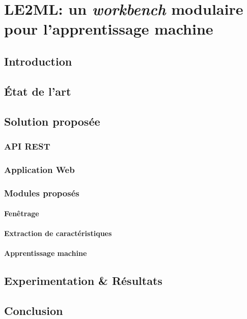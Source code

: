 \chapter{LE2ML: un \textit{workbench} modulaire pour l'apprentissage machine}
\label{chap:6}

\section{Introduction}

\section{État de l'art}

\section{Solution proposée}

\subsection{API REST}

\subsection{Application Web}

\subsection{Modules proposés}

\subsubsection{Fenêtrage}

\subsubsection{Extraction de caractéristiques}

\subsubsection{Apprentissage machine}

\section{Experimentation \& Résultats}

\section{Conclusion}